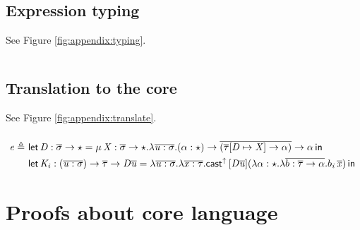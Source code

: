 \subsection{Expression typing}
See Figure \ref{fig:appendix:typing}.
\begin{figure*}[ht]
$\;$\ottdefnctxsrc{}
\ottdefnpgmsrc{}
\ottdefndeclsrc{}
\ottdefnpatsrc{}
\ottdefnexprsrc{}
\caption{Typing rules of source language}
\label{fig:appendix:typing}
\end{figure*}

\subsection{Translation to the core}
See Figure \ref{fig:appendix:translate}.
\begin{figure*}[ht]
$\,$
\ottdefnpgmtrans{}
\ottdefndecltrans{}
\begin{align*}
\mathit{e}  \triangleq ~  &  \mathsf{let} \, \mathit{D}  :  \overline{  \sigma  }  \rightarrow  \star  =  \mu \, \mathit{X}  :  \overline{  \sigma  }  \rightarrow  \star  .  \lambda  \overline{  \mathit{u}  :  \sigma  }  .  (  \alpha  :  \star  )  \rightarrow  \overline{  (  \overline{  \tau  }  [  \mathit{D}  \mapsto  \mathit{X}  ]  \rightarrow  \alpha  )  }  \rightarrow  \alpha \, \mathsf{in} \, \\ &  \mathsf{let} \, \mathit{K_{\mathit{i}}}  :  (  \overline{  \mathit{u}  :  \sigma  }  )  \rightarrow  \overline{  \tau  }  \rightarrow  \mathit{D}    \overline{  \mathit{u}  }  =  \lambda  \overline{  \mathit{u}  :  \sigma  }  .  \lambda  \overline{  \mathit{x}  :  \tau  }  .  \mathsf{cast}^{\uparrow} \, [  \mathit{D}    \overline{  \mathit{u}  }  ]  (  \lambda  \alpha  :  \star  .  \lambda  \overline{  b  :  \overline{  \tau  }  \rightarrow  \alpha  }  .  b_{\mathit{i}} \, \overline{  \mathit{x}  }  ) \, \mathsf{in} \, 
\end{align*}
\ottdefnpattrans{}
\ottdefnexprtrans{}
\caption{Translation rules of source language}
\label{fig:appendix:translate}
\end{figure*}

\section{Proofs about core language}
